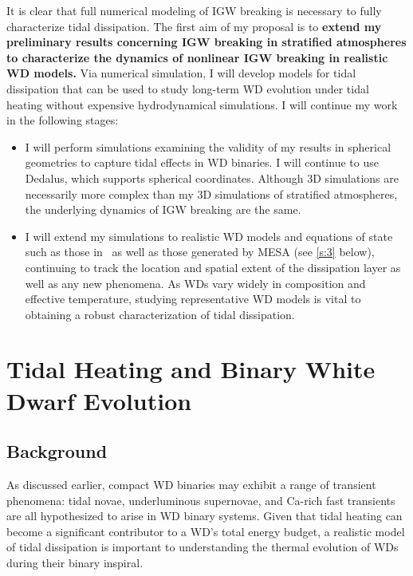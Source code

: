 \documentclass[12pt,
        usenames, %
        dvipsnames %
    ]{article}
\begin{document}
It is clear that full numerical modeling of IGW breaking is necessary to fully
characterize tidal dissipation. The first aim of my proposal is to
\textbf{extend my preliminary results concerning IGW breaking in stratified
atmospheres to characterize the dynamics of nonlinear IGW breaking in realistic
WD models.} Via numerical simulation, I will develop models for tidal
dissipation that can be used to study long-term WD evolution under tidal heating
without expensive hydrodynamical simulations. I will continue my work in the
following stages:
\begin{itemize}
    \item I will perform simulations examining the validity of my results in
        spherical geometries to capture tidal effects in WD binaries. I will
        continue to use Dedalus, which supports spherical coordinates. Although
        3D simulations are necessarily more complex than my 3D simulations of
        stratified atmospheres, the underlying dynamics of IGW breaking are the
        same.

    \item I will extend my simulations to realistic WD models and equations of
        state such as those in~\cite{brassard1992} as well as those generated by
        MESA\cite{MESA} (see \autoref{s:3} below), continuing to track the
        location and spatial extent of the dissipation layer as well as any new
        phenomena. As WDs vary widely in composition and effective temperature,
        studying representative WD models is vital to obtaining a robust
        characterization of tidal dissipation.
\end{itemize}

\section{Tidal Heating and Binary White Dwarf Evolution}\label{s:3}

\subsection{Background}

As discussed earlier, compact WD binaries may exhibit a range of transient
phenomena: tidal novae\cite{tidal_novae}, underluminous
supernovae\cite{underlum}, and Ca-rich fast transients\cite{carich} are all
hypothesized to arise in WD binary systems. Given that tidal heating can become
a significant contributor to a WD's total energy budget, a realistic model of
tidal dissipation is important to understanding the thermal evolution of WDs
during their binary inspiral.
\end{document}
